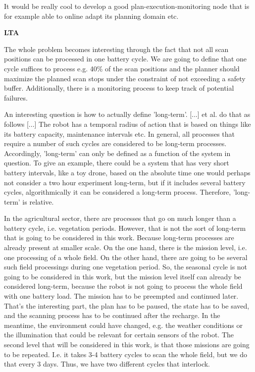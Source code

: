 \documentclass[german, master, expose, latin1]{base/thesis_KBS}
\begin{document}
It would be really cool to develop a good plan-execution-monitoring node that is for example able to online adapt its planning domain etc.\newline

\textbf{LTA}\newline

The whole problem becomes interesting through the fact that not all scan positions can be processed in one battery cycle.
We are going to define that one cycle suffices to process e.g. 40\% of the scan positions and the planner should maximize the planned scan stops under the
constraint of not exceeding a safety buffer. Additionally, there is a monitoring process to keep track of potential failures.\newline

An interesting question is how to actually define 'long-term'. [...] et al. do that as follows [...] The robot has a temporal radius of action that is based
on things like its battery capacity, maintenance intervals etc. In general, all processes that require a number of such cycles are considered to be long-term processes.
Accordingly, 'long-term' can only be defined as a function of the system in question. To give an example, there could be a system that has very short battery intervals,
like a toy drone, based on the absolute time one would perhaps not consider a two hour experiment long-term, but if it includes several battery cycles, algorithmically
it can be considered a long-term process. Therefore, 'long-term' is relative.\newline

In the agricultural sector, there are processes that go on much longer than a battery cycle, i.e. vegetation periods.
However, that is not the sort of long-term that is going to be considered in this work. Because long-term processes are already present at smaller scale.
On the one hand, there is the mission level, i.e. one processing of a whole field. On the other hand, there are going to be several such field processings during one vegetation
period. So, the seasonal cycle is not going to be considered in this work, but the mission level itself can already be considered long-term, because the robot is not
going to process the whole field with one battery load. The mission has to be preempted and continued later. That's the interesting part, the plan has to be paused,
the state has to be saved, and the scanning process has to be continued after the recharge. In the meantime, the environment could have changed, e.g. the weather conditions
or the illumination that could be relevant for certain sensors of the robot. The second level that will be considered in this work, is that those missions are going
to be repeated. I.e. it takes 3-4 battery cycles to scan the whole field, but we do that every 3 days. Thus, we have two different cycles that interlock.\newline
\end{document}

